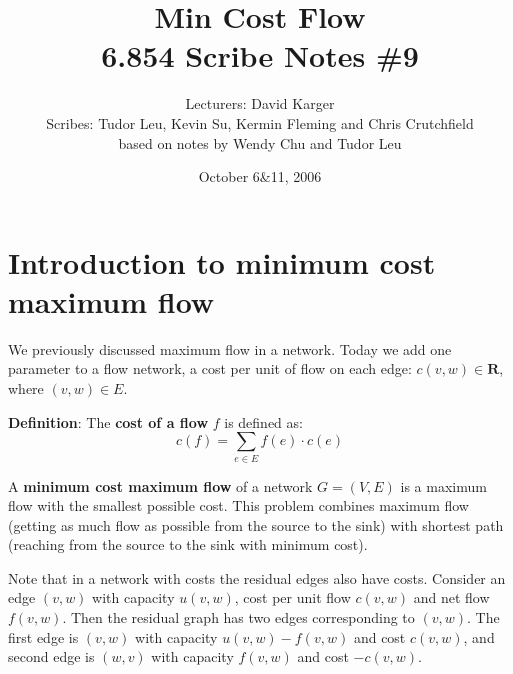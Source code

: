 \documentclass{article}
\title{Min Cost Flow\\ 6.854 Scribe Notes \#9}
\date{October 6\&11, 2006}
\author{Lecturers: David Karger\\ Scribes: Tudor Leu, Kevin Su, Kermin Fleming and Chris Crutchfield\\ based on notes by Wendy Chu and Tudor Leu}
\begin{document}
%
%
%
%

%




\section{Introduction to minimum cost maximum flow}

We previously discussed maximum flow in a network. Today we add one parameter to a flow network, a cost per unit of flow on each edge: $c(v, w) \in \mathbf{R}$, where $(v, w) \in E$.

\textbf{Definition}:
    The {\bf cost of a flow} $f$ is defined as:
\begin{displaymath}
c(f) = \sum_{e \in E} f(e)\cdot c(e)
\end{displaymath}

A {\bf minimum cost maximum flow} of a network $G=(V, E)$ is a maximum flow with the smallest possible cost. This problem combines maximum flow (getting as much flow as possible from the source to the sink) with shortest path (reaching from the source to the sink with minimum cost). 

Note that in a network with costs the residual edges also have costs. Consider an edge $(v, w)$ with capacity $u(v, w)$, cost per unit flow $c(v, w)$ and net flow $f(v, w)$. Then the residual graph has two edges corresponding to $(v, w)$. The first edge is $(v, w)$ with capacity $u(v, w) - f(v, w)$ and cost $c(v, w)$, and second edge is $(w, v)$ with capacity $f(v, w)$ and cost $-c(v, w)$. 
\end{document}
